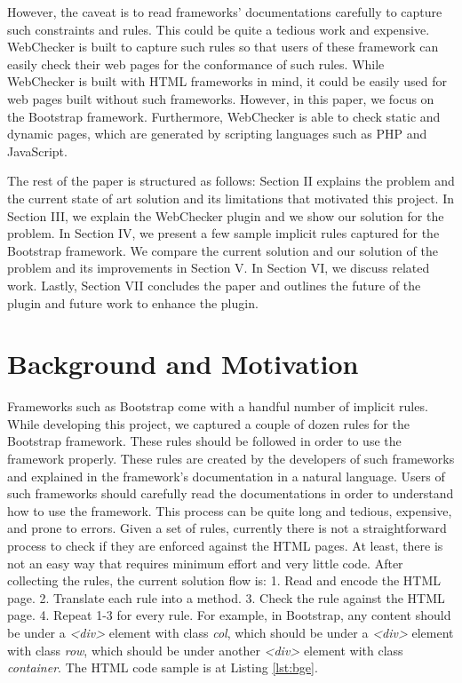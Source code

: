 \documentclass[conference]{IEEETran}
\begin{document}
However, the caveat is to read frameworks' documentations carefully to capture such constraints and rules. This could be quite a tedious work and expensive. WebChecker is built to capture such rules so that users of these framework can easily check their web pages for the conformance of such rules. While WebChecker is built with HTML frameworks in mind, it could be easily used for web pages built without such frameworks. However, in this paper, we focus on the Bootstrap framework. Furthermore, WebChecker is able to check static and dynamic pages, which are generated by scripting languages such as PHP and JavaScript. 

The rest of the paper is structured as follows: Section II explains the problem and the current state of art solution and its limitations that motivated this project. In Section III, we explain the WebChecker plugin and we show our solution for the problem. In Section IV, we present a few sample implicit rules captured for the Bootstrap framework. We compare the current solution and our solution of the problem and its improvements in Section V. In Section VI, we discuss related work. Lastly, Section VII concludes the paper and outlines the future of the plugin and future work to enhance the plugin.  

\section{Background and Motivation}

Frameworks such as Bootstrap come with a handful number of implicit rules. While developing this project, we captured a couple of dozen rules for the Bootstrap framework. These rules should be followed in order to use the framework properly. These rules are created by the developers of such frameworks and explained in the framework’s documentation in a natural language. Users of such frameworks should carefully read the documentations in order to understand how to use the framework. This process can be quite long and tedious, expensive, and prone to errors. Given a set of rules, currently there is not a straightforward process to check if they are enforced against the HTML pages. At least, there is not an easy way that requires minimum effort and very little code. After collecting the rules, the current solution flow is:
1. Read and encode the HTML page. 
2. Translate each rule into a method. 
3. Check the rule against the HTML page.
4. Repeat 1-3 for every rule.
For example, in Bootstrap, any content should be under a \textit{<div>} element with class \textit{col}, which should be under a \textit{<div>} element with class \textit{row}, which should be under another \textit{<div>} element with class \textit{container}. The HTML code sample is at Listing \ref{lst:bge}.  
\end{document}
